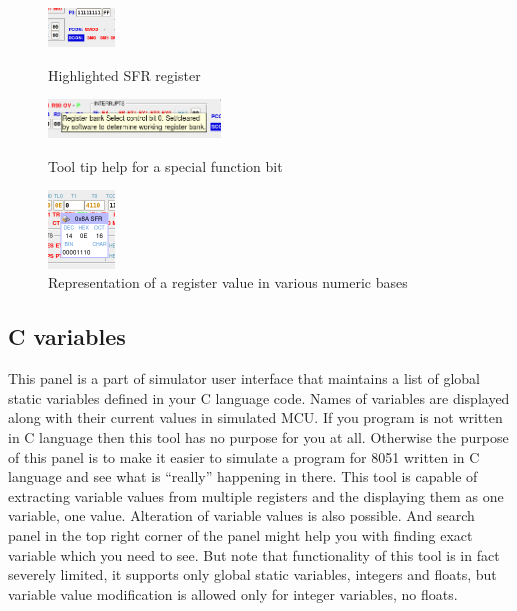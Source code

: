 \documentclass[a4paper,twoside,12pt]{book}
\begin{document}
			\begin{figure}[h!]
				\begin{minipage}[b]{.3\textwidth}
					\centering{}
					\includegraphics[width=50pt]{img/002.png}
					\caption{Highlighted SFR register}
				\end{minipage}
				\begin{minipage}[b]{.3\textwidth}
					\centering{}
					\includegraphics[width=130pt]{img/003.png}
					\caption{Tool tip help for a special function bit}
				\end{minipage}
				\begin{minipage}[b]{.3\textwidth}
					\centering{}
					\includegraphics[width=50pt]{img/004.png}
					\caption{Representation of a register value in various numeric bases}
				\end{minipage}
			\end{figure}

		\subsection{C variables}
			This panel is a part of simulator user interface that maintains a list of global static variables defined in your C language code. Names of variables are displayed along with their current values in simulated MCU. If you program is not written in C language then this tool has no purpose for you at all. Otherwise the purpose of this panel is to make it easier to simulate a program for 8051 written in C language and see what is ``really'' happening in there. This tool is capable of extracting variable values from multiple registers and the displaying them as one variable, one value. Alteration of variable values is also possible. And search panel in the top right corner of the panel might help you with finding exact variable which you need to see. But note that functionality of this tool is in fact severely limited, it supports only global static variables, integers and floats, but variable value modification is allowed only for integer variables, no floats.
\end{document}
